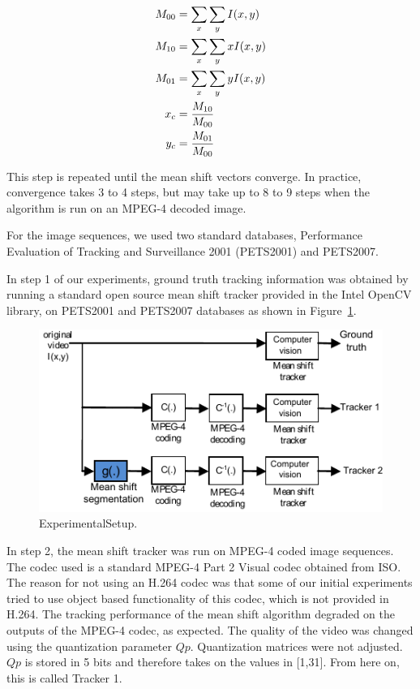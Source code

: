 \documentclass{article}
\begin{document}
\begin{align}
	\label{eq:MeanShiftEquations}
	M_{00}&=\sum_x\sum_yI(x,y)\notag\\
	M_{10}&=\sum_x\sum_yxI(x,y)\notag\\
	M_{01}&=\sum_x\sum_yyI(x,y)\\
	x_c&=\frac{M_{10}}{M_{00}}\notag \\
	y_c&=\frac{M_{01}}{M_{00}} \notag
\end{align}

This step is repeated until the mean shift vectors converge.  In practice, convergence takes 3 to 4 steps, but may take up to 8 to 9 steps when the algorithm is run on an MPEG-4 decoded image.  

For the image sequences, we used two standard databases, Performance Evaluation of Tracking and Surveillance 2001 (PETS2001) and PETS2007.  

In step 1 of our experiments, ground truth tracking information was obtained by running a standard open source mean shift tracker provided in the Intel OpenCV library, on PETS2001 and PETS2007 databases as shown in Figure~\ref{fig:ExperimentalSetup}.  

\begin{figure}[h]
			\centering
			\includegraphics[width=.45\textwidth]{figs/ICIP2009_ExperimentalSetup_sigProc}
			\caption{ExperimentalSetup.}
			\label{fig:ExperimentalSetup}
\end{figure}

In step 2, the mean shift tracker was run on MPEG-4 coded image sequences.  The codec used is a standard MPEG-4 Part 2 Visual codec obtained from ISO.  The reason for not using an H.264 codec was that some of our initial experiments tried to use object based functionality of this codec, which is not provided in H.264.  The tracking performance of the mean shift algorithm degraded on the outputs of the MPEG-4 codec, as expected.  The quality of the video was changed using the quantization parameter $Qp$.  Quantization matrices were not adjusted.  $Qp$ is stored in 5 bits and therefore takes on the values in [1,31].  From here on, this is called Tracker 1.
\end{document}

